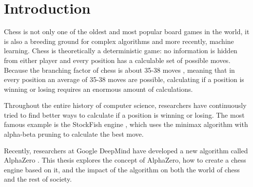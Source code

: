 \documentclass{article}
\begin{document}
\newpage
\setcounter{section}{0}
\section{Introduction}


Chess is not only one of the oldest and most popular board games in the world, it is also a breeding ground for
complex algorithms and more recently, machine learning. Chess is theoretically a deterministic game: 
no information is hidden from either player and every position has a calculable set of possible moves.
Because the branching factor of chess is about 35-38 moves \cite{BranchingFactorChessprogramming}, 
meaning that in every position an average of 35-38 moves are possible, 
calculating if a position is winning or losing requires an enormous amount of calculations.

Throughout the entire history of computer science, researchers have continuously tried to find better
ways to calculate if a position is winning or losing. The most famous example is the StockFish 
engine \cite{StockfishChess2022}, which uses the minimax algorithm with alpha-beta pruning to calculate the best move.

Recently, researchers at Google DeepMind have developed a new algorithm called AlphaZero \cite{AlphaZero2022}.
This thesis explores the concept of AlphaZero, how to create a chess engine based on it, and the impact of 
the algorithm on both the world of chess and the rest of society.
\end{document}
